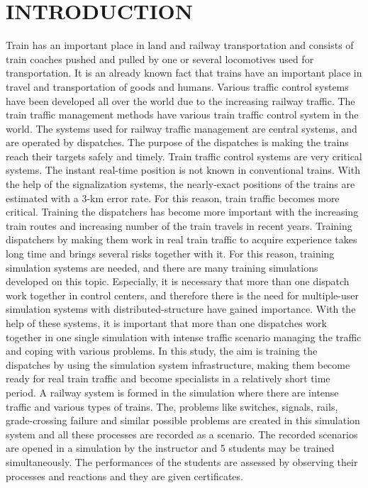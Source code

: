 \documentclass[conference]{IEEEtran}
\begin{document}
\section{INTRODUCTION}
Train has an important place in land and railway transportation and consists of train coaches pushed and pulled by one or several locomotives used for transportation. It is an already known fact that trains have an important place in travel and transportation of goods and humans. Various traffic control systems have been developed all over the world due to the increasing railway traffic. The train traffic management methods have various train traffic control system in the world. 
The systems used for railway traffic management are central systems, and are operated by dispatches. The purpose of the dispatches is making the trains reach their targets safely and timely. 
Train traffic control systems are very critical systems. The instant real-time position is not known in conventional trains. With the help of the signalization systems, the nearly-exact positions of the trains are estimated with a 3-km error rate. For this reason, train traffic becomes more critical. Training the dispatchers has become more important with the increasing train routes and increasing number of the train travels in recent years. Training dispatchers by making them work in real train traffic to acquire experience takes long time and brings several risks together with it. For this reason, training simulation systems are needed, and there are many training simulations developed on this topic. Especially, it is necessary that more than one dispatch work together in control centers, and therefore 
there is the need for multiple-user simulation systems with distributed-structure have gained importance. With the help of these systems, it is important that more than one dispatches work together in one single simulation with intense traffic scenario managing the traffic and coping with various problems. 
In this study, the aim is training the dispatches by using the simulation system infrastructure, making them become ready for real train traffic and become specialists in a relatively short time period. A railway system is formed in the simulation where there are intense traffic and various types of trains. The, problems like switches, signals, rails, grade-crossing failure and similar possible problems are created in this simulation system and all these processes are recorded as a scenario. The recorded scenarios are opened in a simulation by the instructor and 5 students may be trained simultaneously. The performances of the students are assessed by observing their processes and reactions and they are given certificates. 
\end{document}
